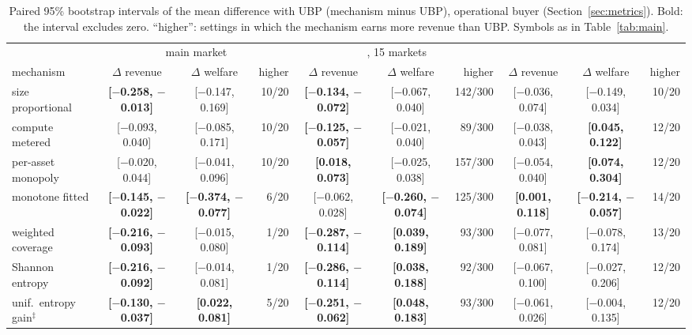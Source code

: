 
\begin{table}[t]
  \centering
  \footnotesize
  \setlength{\tabcolsep}{2.7pt}
  \caption{Paired 95\% bootstrap intervals of the mean difference with UBP (mechanism minus UBP), operational buyer (Section~\ref{sec:metrics}). Bold: the interval excludes zero. ``higher'': settings in which the mechanism earns more revenue than UBP. Symbols as in Table~\ref{tab:main}.}
  \label{tab:comparisons}
  \begin{tabular}{@{}lccrccrccr@{}}
    \toprule
    & \multicolumn{3}{c}{\sqlshare{} main market} & \multicolumn{3}{c}{\sqlshare{}, 15 markets} & \multicolumn{3}{c}{\tpch{}} \\
    \cmidrule(lr){2-4}\cmidrule(lr){5-7}\cmidrule(lr){8-10}
    mechanism & $\Delta$ revenue & $\Delta$ welfare & higher & $\Delta$ revenue & $\Delta$ welfare & higher & $\Delta$ revenue & $\Delta$ welfare & higher \\
    \midrule
    size proportional & \textbf{[$-$0.258, $-$0.013]} & [$-$0.147, 0.169] & 10/20 & \textbf{[$-$0.134, $-$0.072]} & [$-$0.067, 0.040] & 142/300 & [$-$0.036, 0.074] & [$-$0.149, 0.034] & 10/20 \\
    compute metered & [$-$0.093, 0.040] & [$-$0.085, 0.171] & 10/20 & \textbf{[$-$0.125, $-$0.057]} & [$-$0.021, 0.040] & 89/300 & [$-$0.038, 0.043] & \textbf{[0.045, 0.122]} & 12/20 \\
    per-asset monopoly & [$-$0.020, 0.044] & [$-$0.041, 0.096] & 10/20 & \textbf{[0.018, 0.073]} & [$-$0.025, 0.038] & 157/300 & [$-$0.054, 0.040] & \textbf{[0.074, 0.304]} & 12/20 \\
    monotone fitted & \textbf{[$-$0.145, $-$0.022]} & \textbf{[$-$0.374, $-$0.077]} & 6/20 & [$-$0.062, 0.028] & \textbf{[$-$0.260, $-$0.074]} & 125/300 & \textbf{[0.001, 0.118]} & \textbf{[$-$0.214, $-$0.057]} & 14/20 \\
    \midrule
    \qirana{} weighted coverage & \textbf{[$-$0.216, $-$0.093]} & [$-$0.015, 0.080] & 1/20 & \textbf{[$-$0.287, $-$0.114]} & \textbf{[0.039, 0.189]} & 93/300 & [$-$0.077, 0.081] & [$-$0.078, 0.174] & 13/20 \\
    \qirana{} Shannon entropy & \textbf{[$-$0.216, $-$0.092]} & [$-$0.014, 0.081] & 1/20 & \textbf{[$-$0.286, $-$0.114]} & \textbf{[0.038, 0.188]} & 92/300 & [$-$0.067, 0.100] & [$-$0.027, 0.206] & 12/20 \\
    \qirana{} unif.\ entropy gain$^{\ddagger}$ & \textbf{[$-$0.130, $-$0.037]} & \textbf{[0.022, 0.081]} & 5/20 & \textbf{[$-$0.251, $-$0.062]} & \textbf{[0.048, 0.183]} & 93/300 & [$-$0.061, 0.026] & [$-$0.004, 0.135] & 12/20 \\

\end{tabular}
\end{table}
